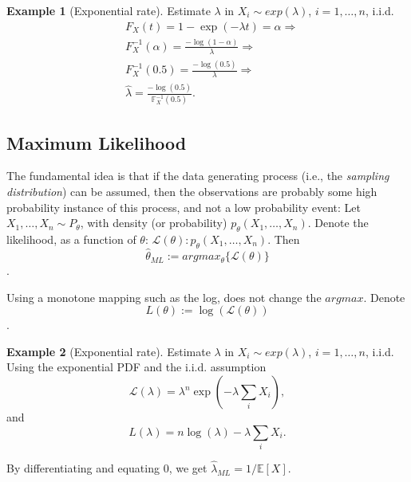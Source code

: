 \documentclass[12pt,a4paper]{article}
\theoremstyle{plain}
\theoremstyle{definition}
\newtheorem{example}{Example}
\newcommand{\expectn}[1]{\mathbb{E}[#1]}
\newcommand{\cdf}[2]{F_{#1}(#2)}
\newcommand{\icdf}[2]{F^{-1}_{#1}(#2)}
\newcommand{\icdfn}[2]{\mathbb{F}^{-1}_{#1}(#2)}
\newcommand{\lik}{\mathcal{L}}
\newcommand{\loglik}{L}
\begin{document}
\begin{example}[Exponential rate]
Estimate $\lambda$ in $X_i \sim exp(\lambda)$, $i=1,\dots,n$, i.i.d.
\begin{align*}
	& \cdf{X}{t} = 1-\exp(-\lambda t) = \alpha \Rightarrow \\
	& \icdf{X}{\alpha} = \frac{-\log(1-\alpha)}{\lambda} \Rightarrow \\
	& \icdf{X}{0.5} = \frac{-\log(0.5)}{\lambda} \Rightarrow \\
	& \hat{\lambda} = \frac{-\log(0.5)}{\icdfn{X}{0.5}}.
\end{align*}

\end{example}


\subsection{Maximum Likelihood}
\label{sec:ml}

The fundamental idea is that if the data generating process (i.e., the \emph{sampling distribution}) can be assumed, then the observations are probably some high probability instance of this process, and not a low probability event:
Let $X_1,\dots,X_n \sim P_\theta$, with density (or probability) $p_\theta(X_1,\dots,X_n)$.
Denote the likelihood, as a function of $\theta$: $\lik(\theta): p_\theta(X_1,\dots,X_n)$.
Then $$\hat{\theta}_{ML}:= argmax_{\theta}\{ \lik(\theta) \}$$.

Using a monotone mapping such as the log, does not change the $argmax$. 
Denote $$\loglik(\theta):=\log(\lik(\theta))$$.

 
\begin{example}[Exponential rate]

Estimate $\lambda$ in $X_i \sim exp(\lambda)$, $i=1,\dots,n$, i.i.d.
Using the exponential PDF and the i.i.d. assumption
$$ \lik(\lambda) = \lambda^n \exp(-\lambda \sum_i X_i), $$
and 
$$ \loglik(\lambda) = n \log(\lambda) -\lambda \sum_i X_i. $$

By differentiating and equating $0$, we get $\hat{\lambda}_{ML}=1/\expectn{X}$.

\end{example}
\end{document}
